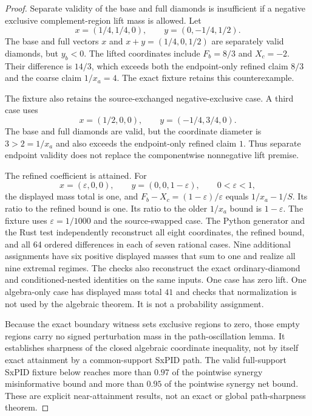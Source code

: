 \documentclass[11pt]{article}
\theoremstyle{definition}
\begin{document}
\begin{proof}
Separate validity of the base and full diamonds is insufficient if a negative exclusive
complement-region lift mass is allowed.  Let
\begin{equation}
  x=(1/4,1/4,0),
  \qquad
  y=(0,-1/4,1/2).
\end{equation}
The base and full vectors $x$ and $x+y=(1/4,0,1/2)$ are separately valid diamonds, but $y_b<0$.
The lifted coordinates include $F_b=8/3$ and $X_c=-2$.  Their difference is $14/3$, which exceeds
both the endpoint-only refined claim $8/3$ and the coarse claim $1/x_a=4$.  The exact fixture
retains this counterexample.

The fixture also retains the source-exchanged negative-exclusive case.  A third case uses
\begin{equation}
  x=(1/2,0,0),
  \qquad
  y=(-1/4,3/4,0).
\end{equation}
The base and full diamonds are valid, but the coordinate diameter is $3>2=1/x_a$ and also exceeds
the endpoint-only refined claim $1$.  Thus separate endpoint validity does not replace the
componentwise nonnegative lift premise.

The refined coefficient is attained.  For
\begin{equation}
  x=(\varepsilon,0,0),
  \qquad
  y=(0,0,1-\varepsilon),
  \qquad
  0<\varepsilon<1,
\end{equation}
the displayed mass total is one, and
$F_b-X_c=(1-\varepsilon)/\varepsilon$ equals $1/x_a-1/S$.  Its ratio to the refined bound is one.
Its ratio to the older $1/x_a$ bound is $1-\varepsilon$.  The fixture uses
$\varepsilon=1/1000$ and the source-swapped case.  The Python generator and the Rust test
independently reconstruct all eight coordinates, the refined bound, and all 64 ordered
differences in each of seven rational cases.  Nine additional assignments have six positive
displayed masses that sum to one and realize all nine extremal regimes.  The checks also
reconstruct the exact ordinary-diamond and conditioned-nested identities on the same inputs.  One
case has zero lift.  One algebra-only case has displayed mass total $41$ and checks that
normalization is not used by the algebraic theorem.  It is not a probability assignment.

Because the exact boundary witness sets exclusive regions to zero, those empty regions carry no
signed perturbation mass in the path-oscillation lemma.  It establishes sharpness of the closed
algebraic coordinate inequality, not by itself exact attainment by a common-support SxPID path.
The valid full-support SxPID fixture below reaches more than $0.97$ of the pointwise synergy
misinformative bound and more than $0.95$ of the pointwise synergy net bound.  These are explicit
near-attainment results, not an exact or global path-sharpness theorem.


\end{proof}
\end{document}
